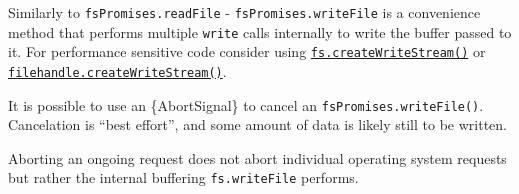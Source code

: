 Similarly to \texttt{fsPromises.readFile} -
\texttt{fsPromises.writeFile} is a convenience method that performs
multiple \texttt{write} calls internally to write the buffer passed to
it. For performance sensitive code consider using
\hyperref[fscreatewritestreampath-options]{\texttt{fs.createWriteStream()}}
or
\hyperref[filehandlecreatewritestreamoptions]{\texttt{filehandle.createWriteStream()}}.

It is possible to use an \{AbortSignal\} to cancel an
\texttt{fsPromises.writeFile()}. Cancelation is ``best effort'', and
some amount of data is likely still to be written.

\begin{Shaded}
\begin{Highlighting}[]
 \OperatorTok{;}
\NormalTok{ \{ }\NormalTok{ \} } \OperatorTok{;}

\NormalTok{ \{}
  \OperatorTok{=}  \NormalTok{()}\OperatorTok{;}
  \OperatorTok{=}\OperatorTok{;}
  \OperatorTok{=}  \NormalTok{(}\NormalTok{(}\NormalTok{))}\OperatorTok{;}
  \OperatorTok{=} \NormalTok{(}\OperatorTok{,}\OperatorTok{,}\OperatorTok{;}

\NormalTok{()}\OperatorTok{;}

  \OperatorTok{;}
\NormalTok{\} }
  \OperatorTok{;}
\NormalTok{\}}
\end{Highlighting}
\end{Shaded}

Aborting an ongoing request does not abort individual operating system
requests but rather the internal buffering \texttt{fs.writeFile}
performs.

